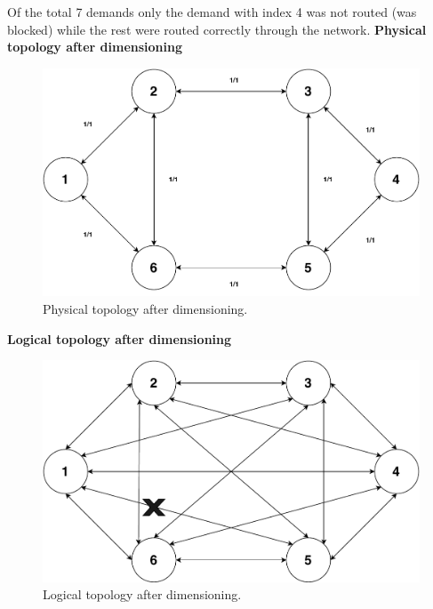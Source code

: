 \normalsize Of the total 7 demands only the demand with index 4 was not routed (was blocked) while the rest were routed correctly through the network.
\clearpage
\textbf{Physical topology after dimensioning}
\begin{figure}[H]
	\centering
	\includegraphics[width=13cm]{sdf/heuristic/transparent/figures/physicalAfterDimensioning}
	\caption{Physical topology after dimensioning.}
\end{figure}

\textbf{Logical topology after dimensioning}
\begin{figure}[H]
	\centering
	\includegraphics[width=13cm]{sdf/heuristic/transparent/figures/logicalAfterDimensioning}
	\caption{Logical topology after dimensioning.}
\end{figure}
